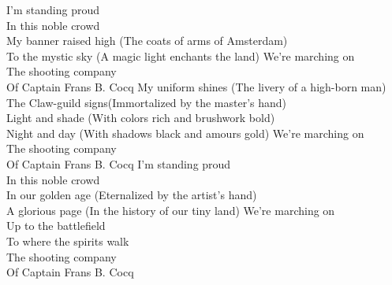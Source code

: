 I'm standing proud\\
In this noble crowd\\
My banner raised high (The coats of arms of Amsterdam)\\
To the mystic sky (A magic light enchants the land)
\hops
{} We're marching on\\
 The shooting company \\
 Of Captain Frans B. Cocq
\hops
My uniform shines (The livery of a high-born man)\\
The Claw-guild signs(Immortalized by the master's hand)\\
Light and shade (With colors rich and brushwork bold)\\
Night and day (With shadows black and amours gold)
\hops
{} We're marching on\\
 The shooting company \\
 Of Captain Frans B. Cocq
\hops
I'm standing proud\\
In this noble crowd\\
In our golden age (Eternalized by the artist's hand)\\
A glorious page (In the history of our tiny land)
\hops
{} We're marching on\\
 Up to the battlefield \\
 To where the spirits walk\\
 The shooting company\\
 Of Captain Frans B. Cocq

\clearpage
{}

